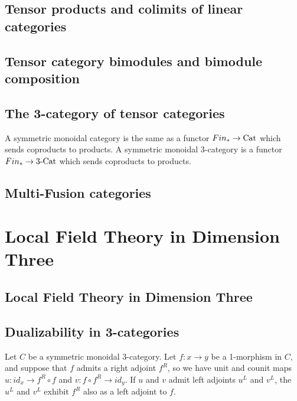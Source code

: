 \documentclass{amsart}
\begin{document}
\subsection{Tensor products and colimits of linear categories}
\subsection{Tensor category bimodules and bimodule composition}
\subsection{The 3-category of tensor categories}

A symmetric monoidal category is the same as a functor $Fin_* \to \mathrm{Cat}$ which sends coproducts to products. A symmetric monoidal 3-category is a functor $Fin_* \to 3\text{-}\mathrm{Cat}$ which sends coproducts to products.

\subsection{Multi-Fusion categories}



\section{Local Field Theory in Dimension Three}

\subsection{Local Field Theory in Dimension Three}
\subsection{Dualizability in 3-categories}


\begin{proposition}
	Let $C$ be a symmetric monoidal 3-category. Let $f: x \to y$ be a 1-morphism in $C$, and suppose that $f$ admits a right adjoint $f^R$,  so we have unit and counit maps $u:id_x \to f^R \circ f$ and $v:f \circ f^R \to id_y$. If $u$ and $v$ admit left adjoints $u^L$ and $v^L$, the $u^L$ and $v^L$ exhibit $f^R$ also as a left adjoint to $f$. 
\end{proposition}
\end{document}
